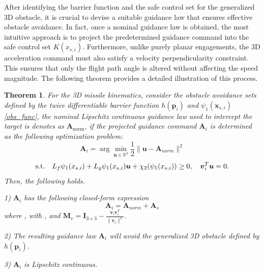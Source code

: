 \documentclass[lettersize,journal]{IEEEtran}
\newtheorem{theorem}{Theorem}
\begin{document}
After identifying the barrier function and the safe control set for the generalized 3D obstacle, it is crucial to devise a suitable guidance law that ensures effective obstacle avoidance. In fact, once a nominal guidance law is obtained, the most intuitive approach is to project the predetermined guidance command into the safe control set $K({x_{s,i}})$. Furthermore, unlike purely planar engagements, the 3D acceleration command must also satisfy a velocity perpendicularity constraint. This ensures that only the flight path angle is altered without affecting the speed magnitude. The following theorem provides a detailed illustration of this process.


\begin{theorem}
	For the 3D missile kinematics, consider the obstacle avoidance sets defined by the twice differentiable barrier function $h({\boldsymbol{p}}_i)$ and ${\psi _1}({\boldsymbol{x}}_{s,i})$ \eqref{obs_func}, the nominal Lipschitz continuous guidance law used to intercept the target is denotes as ${\boldsymbol{A}}_{\mathrm{norm}}$, if the projected guidance command ${\boldsymbol{A}}_i$ is determined as the following optimization problem:
	\begin{equation}
		{\boldsymbol{A}}_i = \arg \min_{{\boldsymbol{u}} \in \mathbb{R}^3} \frac{1}{2} \| {\boldsymbol{u}} - {\boldsymbol{A}}_{norm} \|^2 \nonumber
	\end{equation}
	\begin{equation}
		\label{constraints}
		{\rm{s.t.}} \quad  L_{{f}}{\psi _1}({{x}}_{s,i}) + L_{{g}}{\psi _1}({{x}}_{s,i}){\boldsymbol{u}} + {\chi _2}({\psi _1}({{x}}_{s,i})) \ge 0, \quad {\boldsymbol{v}}_i^T {\boldsymbol{u}} = 0.
	\end{equation}
	Then, the following holds.
	
	1) ${\boldsymbol{A}}_i$ has the following closed-form expression
	\begin{equation}
		\label{ai_as}
		{\boldsymbol{A}}_i = {\boldsymbol{A}}_{norm} + {\boldsymbol{A}}_s
	\end{equation}
	where , with , and ${\boldsymbol{M}}_v = {\boldsymbol{I}}_{3\times 3} - \frac{{\boldsymbol{v}}_i {\boldsymbol{v}}_i^T}{\|{\boldsymbol{v}}_i\|^2}$.
	
	2) The resulting guidance law ${\boldsymbol{A}}_i$ will avoid the generalized 3D obstacle defined by $h({\boldsymbol{p}}_i)$.
	
	3) ${\boldsymbol{A}}_i$ is Lipschitz continuous.
\end{theorem}
\end{document}
